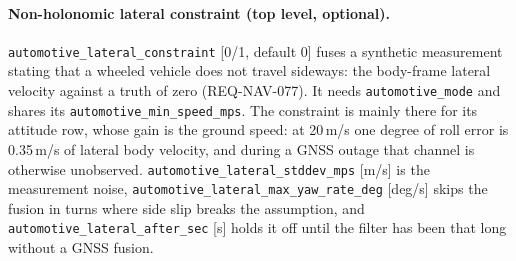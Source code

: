 \documentclass[11pt,a4paper]{article}
\newcommand{\code}[1]{\texttt{#1}}
\begin{document}
\paragraph{Non-holonomic lateral constraint (top level, optional).}
\code{automotive\_\allowbreak{}lateral\_\allowbreak{}constraint} [0/1, default 0] fuses a synthetic
measurement stating that a wheeled vehicle does not travel sideways: the
body-frame lateral velocity against a truth of zero (REQ-NAV-077). It needs
\code{automotive\_\allowbreak{}mode} and shares its \code{automotive\_\allowbreak{}min\_\allowbreak{}speed\_\allowbreak{}mps}.
The constraint is mainly there for its attitude row, whose gain is the ground
speed: at 20\,m/s one degree of roll error is 0.35\,m/s of lateral body
velocity, and during a GNSS outage that channel is otherwise unobserved.
\code{automotive\_\allowbreak{}lateral\_\allowbreak{}stddev\_\allowbreak{}mps} [m/s] is the
measurement noise, \code{automotive\_\allowbreak{}lateral\_\allowbreak{}max\_\allowbreak{}yaw\_\allowbreak{}rate\_\allowbreak{}deg}
[deg/s] skips the fusion in turns where side slip breaks the
assumption, and \code{automotive\_\allowbreak{}lateral\_\allowbreak{}after\_\allowbreak{}sec} [s] holds it off until the filter has been that long
without a GNSS fusion.
\end{document}
